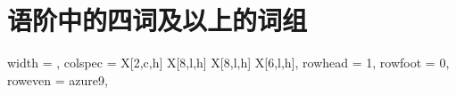 \documentclass[a4paper]{ctexbook}
\begin{document}
{\begin{longtblr}
\bottomrule

\end{longtblr}
}

\chapter{语阶中的四词及以上的词组}

\begin{landscape}
  {\tiny
  \begin{longtblr}[
      caption = {语阶中的四词及以上的词组},
      label = {tab:Four-word and Longer Lexical Bundles in Steps},
  ]{
      width = \linewidth,
      colspec = {X[2,c,h]  X[8,l,h]  X[8,l,h]  X[6,l,h]},
      rowhead = 1, rowfoot = 0, %
      row{even} = {azure9},
  }
      

\end{longtblr}}
\end{landscape}
\end{document}
